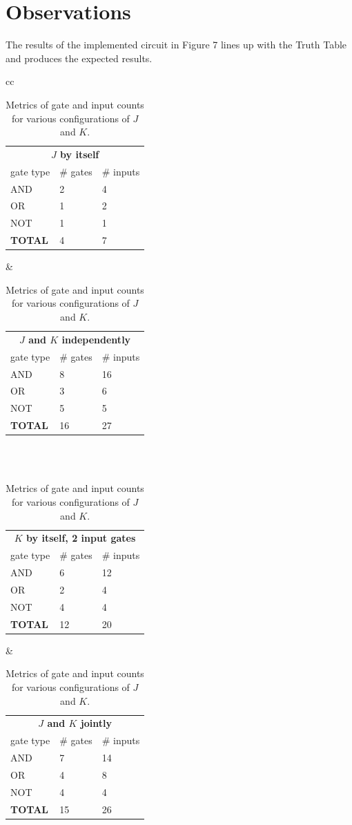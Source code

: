 \documentclass[12pt]{article}
\begin{document}
\section{Observations}
The results of the implemented circuit in Figure 7 lines up with the Truth Table and produces the expected results.
\begin{table}[!htb]
\center
\begin{tabular}{cc}
\begin{tabular}{lll}
\multicolumn{3}{c}{\bf{$J$ by itself}} \\
gate type & \# gates & \# inputs\\
\hline
AND & 2 & 4\\
OR & 1 & 2\\
NOT & 1 & 1 \\
\hline
\bf{TOTAL} & 4 & 7
\end{tabular}
&
\begin{tabular}{lll}
\multicolumn{3}{c}{\bf{$J$ and $K$ independently}} \\
gate type & \# gates & \# inputs\\
\hline
AND & 8 & 16 \\
OR & 3 & 6 \\
NOT & 5 & 5 \\
\hline
\bf{TOTAL} & 16 & 27
\end{tabular}
\\
\\
\begin{tabular}{lll}
\multicolumn{3}{c}{\bf{$K$ by itself, 2 input gates}} \\
gate type & \# gates & \# inputs\\
\hline
AND & 6 & 12 \\
OR & 2 & 4 \\
NOT & 4 & 4 \\
\hline
\bf{TOTAL} & 12 & 20
\end{tabular}
&
\begin{tabular}{lll}
\multicolumn{3}{c}{\bf{$J$ and $K$ jointly}} \\
gate type & \# gates & \# inputs\\
\hline
AND & 7 & 14 \\
OR & 4 & 8 \\
NOT & 4 & 4 \\
\hline
\bf{TOTAL} & 15 & 26
\end{tabular}
\end{tabular} %
\caption{Metrics of gate and input counts for various configurations
of $J$ and $K$.}
\label{tbl:counts}
\end{table}
\end{document}
